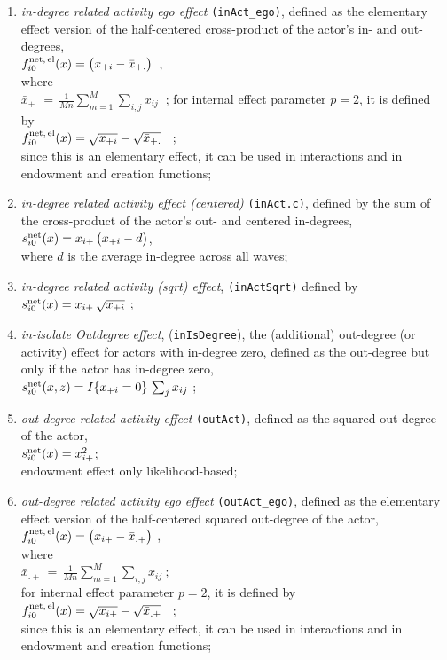\documentclass[a4paper,fleqn,11pt]{article}
\newcommand{\+}{\, + \,}
\newcommand{\vit}{\theenumi}
\begin{document}
\begin{enumerate}
 \item {\em in-degree related activity ego effect} \texttt{(inAct\_ego)},
 	 defined as the elementary effect version of the  half-centered  cross-product
 of the actor's in- and out-degrees,\\
 $ f^{\rm net,\, el}_{i\vit}(x) = \big(  x_{+i} - \bar x_{+.}\big)$\ ,\\
 where\\
 $ \bar x_{+.} \,=\,  \frac{1}{Mn} \sum_{m=1}^M \sum_{i,j} x_{ij} \ $ ;
 for internal effect parameter $p=2$, it is defined by\\
 $f^{\rm net,\, el}_{i\vit}(x)  =   \sqrt{   x_{+i}} - \sqrt{\bar x_{+.}} $ \ ; \\
 since this is an elementary effect, it can be used in interactions
 and in endowment and creation functions;

 \item {\em in-degree related activity effect (centered)} \texttt{(inAct.c)},
 defined by the sum of
 the cross-product of the actor's out- and centered in-degrees,\\
 $s^{\rm net}_{i\vit}(x) =  x_{i+}\,\big( x_{+i} - d \big)$,\\
 where $d$ is the average in-degree across all waves;

 \item {\em in-degree related activity (sqrt) effect}, \texttt{(inActSqrt)}
 defined by  \\
 $s^{\rm net}_{i\vit}(x) = x_{i+}\,\sqrt{x_{+i}}$ ;

\item \emph{in-isolate Outdegree effect}, (\texttt{inIsDegree}), the
      (additional) out-degree (or activity)
      effect for actors with in-degree zero, defined as the out-degree
      but only if the actor has in-degree zero,\\
 $s^{\rm net}_{i\vit}(x, z) =   I\{x_{+i} = 0 \}\, \sum_j x_{ij}   $ ;\\

 \item {\em out-degree related activity effect} \texttt{(outAct)},
 	 defined as the squared out-degree of the actor,\\
 $s^{\rm net}_{i\vit}(x) = x^2_{i+}$;\\
 endowment effect only likelihood-based;

 \item {\em out-degree related activity ego effect} \texttt{(outAct\_ego)},
 	 defined as the elementary effect version of the half-centered
 squared out-degree of the actor,\\
 $ f^{\rm net,\, el}_{i\vit}(x)  =  \big(  x_{i+} - \bar x_{.+}\big)$ ,\\
 where\\
 $ \bar x_{.+} \,=\,  \frac{1}{Mn} \sum_{m=1}^M \sum_{i,j} x_{ij} \ ;  $ \\
 for internal effect parameter $p=2$, it is defined by\\
 $f^{\rm net,\, el}_{i\vit}(x)  =   \sqrt{  x_{i+}} -  \sqrt{\bar x_{.+}} $ \ ; \\
 since this is an elementary effect, it can be used in interactions
 and in endowment and creation functions;


\end{enumerate}
\end{document}
